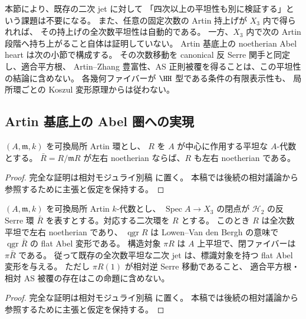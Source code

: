 \begin{remark}[全次数平坦性と内在的相対モジュライの区別]
本節により、既存の二次 jet に対して
「四次以上の平坦性も別に検証する」という課題は不要になる。
また、任意の固定次数の Artin 持上げが $X_3$ 内で得られれば、
その持上げの全次数平坦性は自動的である。
一方、$X_3$ 内で次の Artin 段階へ持ち上がること自体は証明していない。
Artin 基底上の noetherian Abel heart は次の小節で構成する。
その次数移動を canonical 反 Serre 関手と同定し、適合平方根、
Artin--Zhang 豊富性、AS 正則被覆を得ることは、この平坦性の結論に含めない。
各幾何ファイバーが $\HH$ 型である条件の有限表示性も、
局所環ごとの Koszul 変形原理からは従わない。
\end{remark}

\subsection{Artin 基底上の Abel 圏への実現}

\begin{lemma}
\label{lem:artin-noetherian-lift}
$(A,\mathfrak m,k)$ を可換局所 Artin 環とし、
$R$ を $A$ が中心に作用する平坦な $A$-代数とする。
$\bar R=R/\mathfrak mR$ が左右 noetherian ならば、$R$ も左右 noetherian である。
\end{lemma}
\begin{proof}
完全な証明は相対モジュライ別稿
\cite[相対Koszul・Noetherian基底変更・tailsの節]{QuadricModuli2026} に置く。
本稿では後続の相対議論から参照するために主張と仮定を保持する。
\end{proof}

\begin{proposition}
\label{prop:artin-relations-flat-abelian}
$(A,\mathfrak m,k)$ を可換局所 Artin $k$-代数とし、
$\operatorname{Spec}A\to X_3$ の閉点が $\mathcal H_2$ の反 Serre 環
$\bar R$ を表すとする。対応する二次環を $R$ とする。
このとき $R$ は全次数平坦で左右 noetherian であり、
$\operatorname{qgr}R$ は Lowen--Van den Bergh の意味で
$\operatorname{qgr}\bar R$ の flat Abel 変形である。
構造対象 $\pi R$ は $A$ 上平坦で、閉ファイバーは $\pi\bar R$ である。
従って既存の全次数平坦な二次 jet は、標識対象を持つ flat Abel 変形を与える。
ただし $\pi R(1)$ が相対逆 Serre 移動であること、
適合平方根・相対 AS 被覆の存在はこの命題に含めない。
\end{proposition}
\begin{proof}
完全な証明は相対モジュライ別稿
\cite[相対Koszul・Noetherian基底変更・tailsの節]{QuadricModuli2026} に置く。
本稿では後続の相対議論から参照するために主張と仮定を保持する。
\end{proof}
